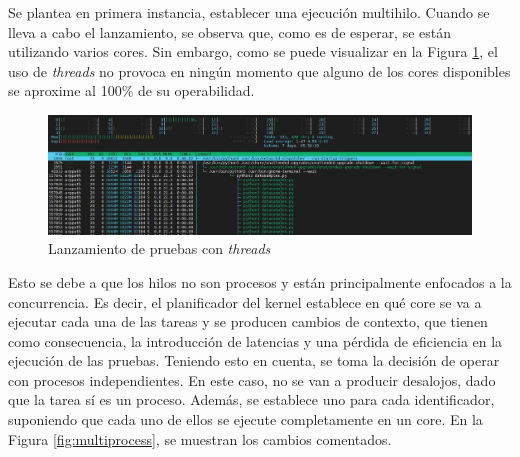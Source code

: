   
  


Se plantea en primera instancia, establecer una ejecución multihilo. Cuando se lleva a cabo el lanzamiento, se observa que, como es de esperar, se están utilizando varios cores. Sin embargo, como se puede visualizar en la Figura \ref{fig:multihilo}, el uso de \textit{threads} no provoca en ningún momento que alguno de los cores disponibles se aproxime al 100\% de su operabilidad.

\vspace{3mm}

\begin{figure}[h!]
  \centering
  \includegraphics[width=1\textwidth]{img/diseno/multihilo.jpg}
  \caption{Lanzamiento de pruebas con \textit{threads}}
  \label{fig:multihilo}
\end{figure}

\vspace{3mm}

Esto se debe a que los hilos no son procesos y están principalmente enfocados a la concurrencia. Es decir, el planificador del kernel establece en qué core se va a ejecutar cada una de las tareas y se producen cambios de contexto, que tienen como consecuencia, la introducción de latencias y una pérdida de eficiencia en la ejecución de las pruebas. Teniendo esto en cuenta, se toma la decisión de operar con procesos independientes. En este caso, no se van a producir desalojos, dado que la tarea sí es un proceso. Además, se establece uno para cada identificador, suponiendo que cada uno de ellos se ejecute completamente en un core. En la Figura \ref{fig:multiprocess}, se muestran los cambios comentados. \cite{thread}

